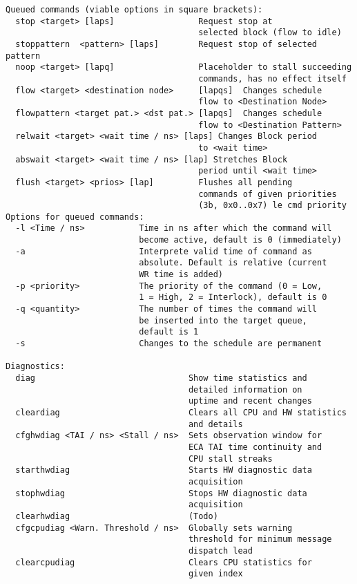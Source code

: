 \begin{lstlisting}[style = helptext]
Queued commands (viable options in square brackets):
  stop <target> [laps]                 Request stop at 
                                       selected block (flow to idle)
  stoppattern  <pattern> [laps]        Request stop of selected pattern
  noop <target> [lapq]                 Placeholder to stall succeeding
                                       commands, has no effect itself
  flow <target> <destination node>     [lapqs]  Changes schedule 
                                       flow to <Destination Node>
  flowpattern <target pat.> <dst pat.> [lapqs]  Changes schedule 
                                       flow to <Destination Pattern>
  relwait <target> <wait time / ns> [laps] Changes Block period
                                       to <wait time>
  abswait <target> <wait time / ns> [lap] Stretches Block 
                                       period until <wait time>
  flush <target> <prios> [lap]         Flushes all pending
                                       commands of given priorities 
                                       (3b, 0x0..0x7) le cmd priority
Options for queued commands:
  -l <Time / ns>           Time in ns after which the command will
                           become active, default is 0 (immediately)
  -a                       Interprete valid time of command as 
                           absolute. Default is relative (current 
                           WR time is added)
  -p <priority>            The priority of the command (0 = Low, 
                           1 = High, 2 = Interlock), default is 0
  -q <quantity>            The number of times the command will 
                           be inserted into the target queue, 
                           default is 1
  -s                       Changes to the schedule are permanent

Diagnostics:
  diag                               Show time statistics and 
                                     detailed information on 
                                     uptime and recent changes
  cleardiag                          Clears all CPU and HW statistics 
                                     and details 
  cfghwdiag <TAI / ns> <Stall / ns>  Sets observation window for 
                                     ECA TAI time continuity and 
                                     CPU stall streaks
  starthwdiag                        Starts HW diagnostic data 
                                     acquisition
  stophwdiag                         Stops HW diagnostic data
                                     acquisition
  clearhwdiag                        (Todo)
  cfgcpudiag <Warn. Threshold / ns>  Globally sets warning 
                                     threshold for minimum message
                                     dispatch lead
  clearcpudiag                       Clears CPU statistics for 
                                     given index
\end{lstlisting}


